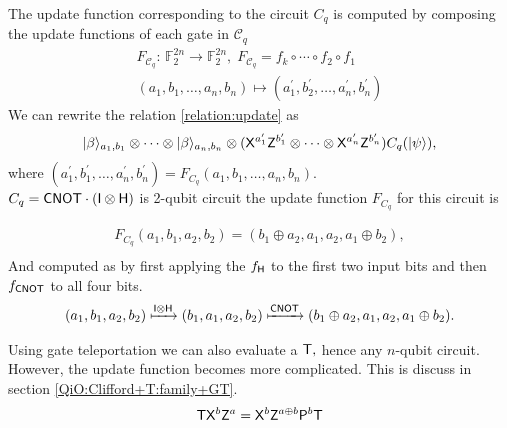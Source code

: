 The update function corresponding to the circuit $C_q$ is computed by composing the update functions of each gate in $\mathcal{C}_q$
\begin{equation*}
\begin{aligned}
F_{\mathcal{C}_q}:\, \mathbb{F}_2^{2n} \rightarrow  \mathbb{F}_2^{2n}, \; F_{\mathcal{C}_q}=f_k\circ\cdots \circ f_2 \circ f_1 \\(a_1,b_1,\dots, a_n,b_n)\mapsto (a_1^\prime,b_2^\prime,\dots, a_n^\prime,b_n^\prime) 
 \end{aligned}
\end{equation*}
We can rewrite the relation \ref{relation:update} as
\begin{equation*}
\begin{aligned}
{\lvert}\beta\rangle_{a_1,b_1}\otimes \cdots \otimes {\lvert}\beta\rangle_{a_n,b_n} \otimes ({\sf X}^{a_1^\prime}{\sf Z}^{b_1^\prime}\otimes \cdots \otimes{\sf X}^{a_n^\prime}{\sf Z}^{b_n^\prime})C_q({\lvert}\psi\rangle),
 \end{aligned}
\end{equation*}
where $(a_1^\prime,b_1^\prime,\dots, a_n^\prime,b_n^\prime)=F_{C_q}(a_1,b_1,\ldots,a_n,b_n).$ \\

 $C_q={\sf CNOT} \cdot ({\sf I} \otimes {\sf H})$ is 2-qubit circuit the update function $F_{C_q}$ for this circuit is 

\begin{equation*}
\begin{aligned}
F_{C_q}(a_1,b_1,a_2,b_2)=(b_1\oplus a_2,a_1,a_2, a_1\oplus b_2),\\
\end{aligned}
\end{equation*}
And computed as by first applying the $f_{\sf H}$ to the first two input bits and then $f_{{\sf CNOT}}$ to all four bits.
\begin{equation*}
\begin{aligned}
(a_1,b_1,a_2,b_2) \xmapsto{{\sf I}\otimes {\sf H}} (b_1,a_1,a_2,b_2)\xmapsto{{\sf CNOT}} (b_1\oplus a_2,a_1,a_2, a_1\oplus b_2).
\end{aligned}
\end{equation*}

\begin{remark}
Using gate teleportation we can also evaluate a  ${\sf T},$  hence any $n$-qubit circuit. However, the update function becomes more complicated. This is discuss in section \ref{QiO:Clifford+T:family+GT}.
						$${\sf T} {\sf X}^b {\sf Z}^a= {\sf X}^b {\sf Z}^{a\oplus b} {\sf P}^b {\sf T}$$
\end{remark}





			
				




